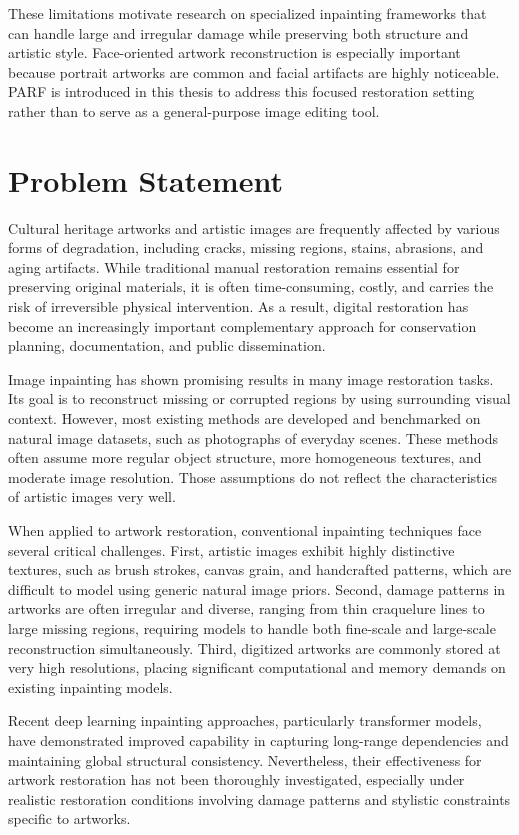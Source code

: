 \documentclass[12pt, twoside]{report}
\begin{document}
These limitations motivate research on specialized inpainting frameworks that can handle large and irregular damage while preserving both structure and artistic style. Face-oriented artwork reconstruction is especially important because portrait artworks are common and facial artifacts are highly noticeable. PARF is introduced in this thesis to address this focused restoration setting rather than to serve as a general-purpose image editing tool.

\section{Problem Statement}
Cultural heritage artworks and artistic images are frequently affected by various forms of degradation, including cracks, missing regions, stains, abrasions, and aging artifacts. While traditional manual restoration remains essential for preserving original materials, it is often time-consuming, costly, and carries the risk of irreversible physical intervention. As a result, digital restoration has become an increasingly important complementary approach for conservation planning, documentation, and public dissemination.

Image inpainting has shown promising results in many image restoration tasks. Its goal is to reconstruct missing or corrupted regions by using surrounding visual context. However, most existing methods are developed and benchmarked on natural image datasets, such as photographs of everyday scenes. These methods often assume more regular object structure, more homogeneous textures, and moderate image resolution. Those assumptions do not reflect the characteristics of artistic images very well.

When applied to artwork restoration, conventional inpainting techniques face several critical challenges. First, artistic images exhibit highly distinctive textures, such as brush strokes, canvas grain, and handcrafted patterns, which are difficult to model using generic natural image priors. Second, damage patterns in artworks are often irregular and diverse, ranging from thin craquelure lines to large missing regions, requiring models to handle both fine-scale and large-scale reconstruction simultaneously. Third, digitized artworks are commonly stored at very high resolutions, placing significant computational and memory demands on existing inpainting models.

Recent deep learning inpainting approaches, particularly transformer models, have demonstrated improved capability in capturing long-range dependencies and maintaining global structural consistency. Nevertheless, their effectiveness for artwork restoration has not been thoroughly investigated, especially under realistic restoration conditions involving damage patterns and stylistic constraints specific to artworks.
\end{document}
